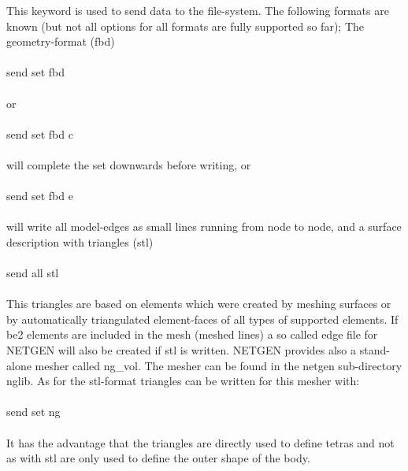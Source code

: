 \documentclass{article}
\begin{document}
This keyword is used to send data to the file-system. The following formats are known (but not all options for all formats are fully supported so far); The geometry-format (fbd)\\\\send set fbd\\\\or\\\\send set fbd c\\\\will complete the set downwards before writing, or\\\\send set fbd e\\\\will write all model-edges as small lines running from node to node, and a surface description with triangles (stl)\\\\send all stl\\\\This triangles are based on elements which were created by meshing surfaces or by automatically triangulated element-faces of all types of supported elements. If be2 elements are included in the mesh (meshed lines) a so called edge file for NETGEN will also be created if stl is written. NETGEN provides also a stand-alone mesher called ng\_vol. The mesher can be found in the netgen sub-directory nglib. As for the stl-format triangles can be written for this mesher with:\\\\send set ng\\\\It has the advantage that the triangles are directly used to define tetras and not as with stl are only used to define the outer shape of the body.
\end{document}
